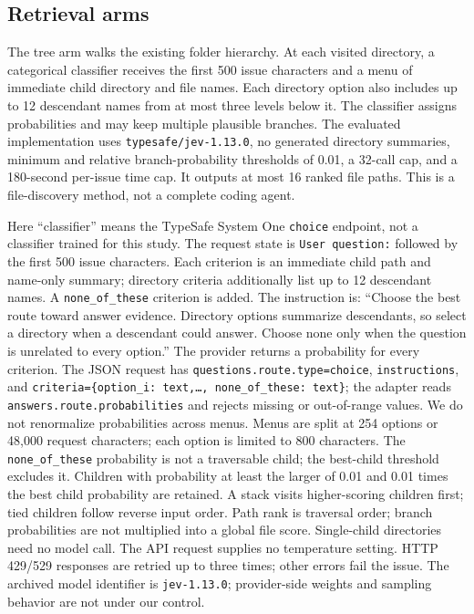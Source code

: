 \documentclass[
]{article}
\newcounter{none} %
\begin{document}
\subsection{Retrieval arms}\label{retrieval-arms}

The tree arm walks the existing folder hierarchy. At each visited
directory, a categorical classifier receives the first 500 issue
characters and a menu of immediate child directory and file names. Each
directory option also includes up to 12 descendant names from at most
three levels below it. The classifier assigns probabilities and may
keep multiple plausible branches. The evaluated
implementation uses \texttt{typesafe/jev-1.13.0}, no generated directory
summaries, minimum and relative branch-probability thresholds of 0.01, a
32-call cap, and a 180-second per-issue time cap. It outputs at most 16
ranked file paths. This is a file-discovery method, not a complete
coding agent.

Here ``classifier'' means the TypeSafe System One \texttt{choice}
endpoint, not a classifier trained for this study. The request state is
\texttt{User question:} followed by the first 500 issue characters.
Each criterion is an immediate child path and name-only summary;
directory criteria additionally list up to 12 descendant names. A
\texttt{none\_of\_these} criterion is added. The instruction is:
``Choose the best route toward answer evidence. Directory options
summarize descendants, so select a directory when a descendant could
answer. Choose none only when the question is unrelated to every
option.'' The provider returns a probability for every criterion.
The JSON request has \texttt{questions.route.type=choice},
\texttt{instructions}, and \texttt{criteria=\{option\_i: text,\ldots,
none\_of\_these: text\}}; the adapter reads
\texttt{answers.route.probabilities} and rejects missing or out-of-range
values. We do not renormalize probabilities across menus. Menus are split at
254 options or 48,000 request characters; each option is limited to
800 characters. The \texttt{none\_of\_these} probability is not a
traversable child; the best-child threshold excludes it. Children with
probability at least the larger of
0.01 and 0.01 times the best child probability are retained. A stack
visits higher-scoring children first; tied children follow reverse
input order. Path rank is traversal order; branch probabilities are not
multiplied into a global file score. Single-child directories need no model call. The API
request supplies no temperature setting. HTTP 429/529 responses are
retried up to three times; other errors fail the issue. The archived
model identifier is \texttt{jev-1.13.0}; provider-side weights and
sampling behavior are not under our control.
\end{document}
